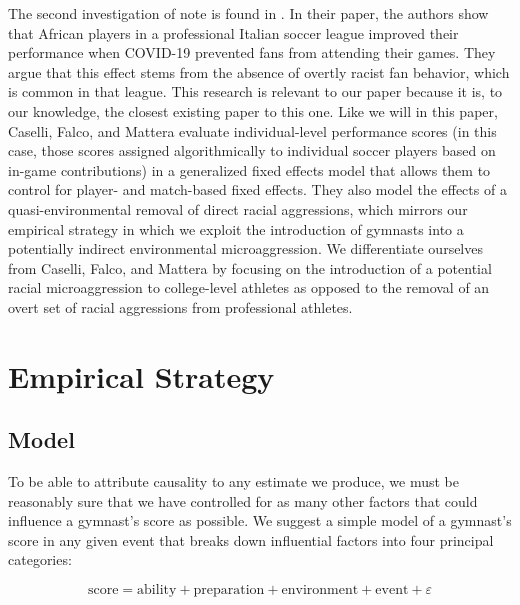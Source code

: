 \documentclass[12pt]{article}
\begin{document}
The second investigation of note is found in \cite{caselli_falco_mattera_2023}. In their paper, the authors show that African players in a professional Italian soccer league improved their performance when COVID-19 prevented fans from attending their games. They argue that this effect stems from the absence of overtly racist fan behavior, which is common in that league. This research is relevant to our paper because it is, to our knowledge, the closest existing paper to this one. Like we will in this paper, Caselli, Falco, and Mattera evaluate individual-level performance scores (in this case, those scores assigned algorithmically to individual soccer players based on in-game contributions) in a generalized fixed effects model that allows them to control for player- and match-based fixed effects. They also model the effects of a quasi-environmental removal of direct racial aggressions, which mirrors our empirical strategy in which we exploit the introduction of gymnasts into a potentially indirect environmental microaggression. We differentiate ourselves from Caselli, Falco, and Mattera by focusing on the introduction of a potential racial microaggression to college-level athletes as opposed to the removal of an overt set of racial aggressions from professional athletes.



\section{Empirical Strategy}
\subsection{Model}
To be able to attribute causality to any estimate we produce, we must be reasonably sure that we have controlled for as many other factors that could influence a gymnast’s score as possible. We suggest a simple model of a gymnast’s score in any given event that breaks down influential factors into four principal categories:

\begin{equation}
    \text{score} = \text{ability} + \text{preparation} + \text{environment} + \text{event} +  \varepsilon
\end{equation}
\end{document}
